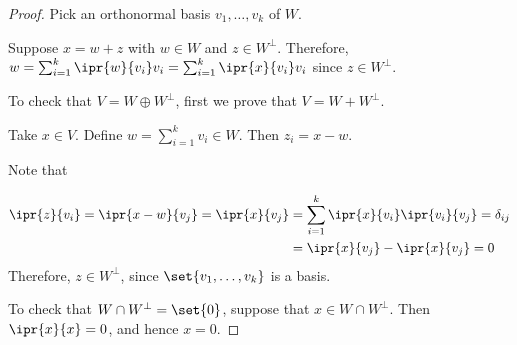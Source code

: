 \documentclass[11pt]{scrartcl}
\begin{document}
\begin{proof}

  Pick an orthonormal basis $v_1, \dots, v_k$ of $W$.

  Suppose $x= w+z$ with $w \in W$ and $z \in W^{\bot}$. Therefore,
  $w = \sum_{i=1}^k\ipr{w}{v_i}v_i = \sum_{i=1}^k\ipr{x}{v_i}v_i$
  since $z\in W^{\bot}$.

  To check that $V = W \oplus W^{\bot}$, first we prove that $V = W + W^{\bot}$.

  Take $x \in V$. Define $w = \sum_{i=1}^k v_i \in W$. Then $z_i = x - w$.

  Note that

  \begin{align}
  \ipr{z}{v_i} = \ipr{x-w}{v_j} = \ipr{x}{v_j} &=
    \sum_{i=1}^k\ipr{x}{v_i}\ipr{v_i}{v_j} = \delta_{ij}\\
    &= \ipr{x}{v_j}- \ipr{x}{v_j} = 0
  \end{align}
  Therefore, $z\in W^{\bot}$, since  $\set{v_1, \dots, v_k}$ is a basis.

  To check that $W\cap W^{\bot} = \set{0}$, suppose that
  $x\in W\cap W^{\bot}$. Then $\ipr{x}{x}= 0$,  and hence $x= 0$.
\end{proof}
\end{document}
